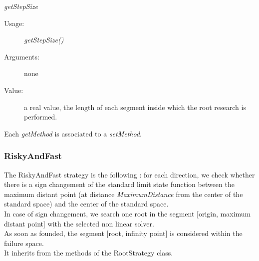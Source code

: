 \begin{description}
\begin{description}
\begin{description}
\end{description}
\bigskip
\item \textit{getStepSize}
\begin{description}
\item[Usage:] \textit{getStepSize()}
\item[Arguments:] none
\item[Value:] a real value, the length of each segment inside which the root research is performed.
\end{description}
\end{description}

Each \textit{getMethod}  is associated to a \textit{setMethod}.
\end{description}


\newpage
\subsubsection{RiskyAndFast}

The RiskyAndFast strategy is the following : for each direction, we check whether there is a sign changement of the standard limit state function between the maximum distant point (at distance {\itshape MaximumDistance} from the center of the standard space) and the center of the standard space. \\
In case of sign changement, we search one root in the segment [origin, maximum distant point] with the selected non linear solver.\\
As soon as founded, the segment [root, infinity point] is considered within the failure space.\\

It inherits from the methods of the RootStrategy class.

